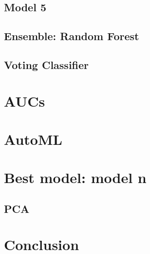\documentclass[titlepage, 11pt]{article}
\begin{document}
\subsection{Model 5}


\subsection{Ensemble: Random Forest}


\subsection{Voting Classifier}


\section{AUCs}

\section{AutoML}

\section{Best model: model n}
\subsection*{PCA}

\section*{Conclusion}

\end{document}
